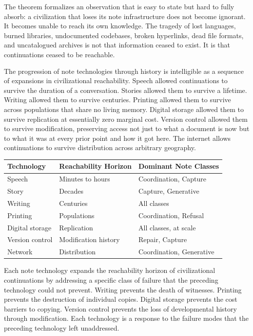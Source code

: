 \documentclass[12pt, a4paper]{article}
\theoremstyle{plain}
\theoremstyle{definition}
\theoremstyle{remark}
\begin{document}
The theorem formalizes an observation that is easy to state but hard to fully
absorb: a civilization that loses its note infrastructure does not become ignorant.
It becomes unable to reach its own knowledge. The tragedy of lost languages, burned
libraries, undocumented codebases, broken hyperlinks, dead file formats, and
uncatalogued archives is not that information ceased to exist. It is that
continuations ceased to be reachable.

The progression of note technologies through history is intelligible as a sequence
of expansions in civilizational reachability. Speech allowed continuations to
survive the duration of a conversation. Stories allowed them to survive a lifetime.
Writing allowed them to survive centuries. Printing allowed them to survive across
populations that share no living memory. Digital storage allowed them to survive
replication at essentially zero marginal cost. Version control allowed them to
survive modification, preserving access not just to what a document is now but to
what it was at every prior point and how it got here. The internet allows
continuations to survive distribution across arbitrary geography.

\begin{center}
\begin{tabular}{lll}
\toprule
Technology & Reachability Horizon & Dominant Note Classes \\
\midrule
Speech & Minutes to hours & Coordination, Capture \\
Story & Decades & Capture, Generative \\
Writing & Centuries & All classes \\
Printing & Populations & Coordination, Refusal \\
Digital storage & Replication & All classes, at scale \\
Version control & Modification history & Repair, Capture \\
Network & Distribution & Coordination, Generative \\
\bottomrule
\end{tabular}
\end{center}

Each note technology expands the reachability horizon of civilizational
continuations by addressing a specific class of failure that the preceding
technology could not prevent. Writing prevents the death of witnesses. Printing
prevents the destruction of individual copies. Digital storage prevents the cost
barriers to copying. Version control prevents the loss of developmental history
through modification. Each technology is a response to the failure modes that the
preceding technology left unaddressed.
\end{document}
